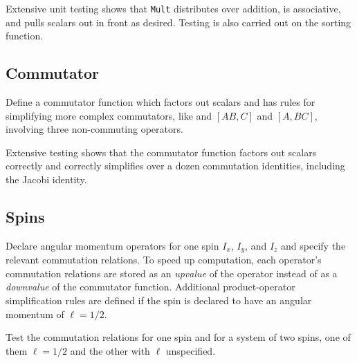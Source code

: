 

Extensive unit testing shows that \verb+Mult+ distributes over addition, is associative, and pulls scalars out in front as desired.
Testing is also carried out on the sorting function.



\subsection{Commutator}

Define a commutator function which factors out scalars and has rules for simplifying more complex commutators, like and $[A B, C]$ and $[A, B C]$, involving three non-commuting operators.



Extensive testing shows that the commutator function factors out scalars correctly and correctly simplifies over a dozen commutation identities, including the Jacobi identity.




\subsection{Spins}

Declare angular momentum operators for one spin $I_x$, $I_y$, and $I_z$ and specify the relevant commutation relations.
To speed up computation, each operator's commutation relations are stored as an \emph{upvalue} of the operator instead of as a \emph{downvalue} of the commutator function.
Additional product-operator simplification rules are defined if the spin is declared to have an angular momentum of $\ell = 1/2$.



Test the commutation relations for one spin and for a system of two spins, one of them $\ell = 1/2$ and the other with $\ell$ unspecified.




